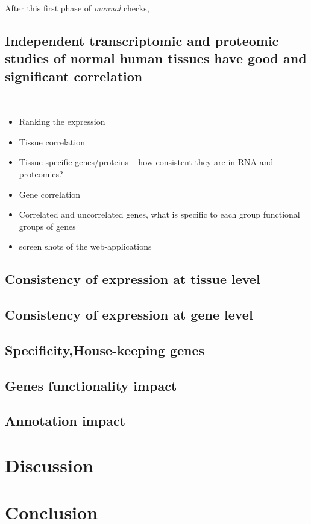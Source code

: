 After this first phase of \emph{manual} checks, 

\subsection{Independent transcriptomic and proteomic studies of normal
human tissues have good and significant correlation}
\label{sec:IntegrationGoodCorrProtTrans}



\clearpage\

\begin{itemize}
\item Ranking the expression
\item Tissue correlation
\item Tissue specific genes/proteins – how consistent they are in RNA and proteomics?
\item Gene correlation
\item Correlated and uncorrelated genes, what is specific to each group
    functional groups of genes
\item screen shots of the web-applications
\end{itemize}


\subsection{Consistency of expression at tissue level}
\subsection{Consistency of expression at gene level}
\subsection{Specificity,House-keeping genes}
\subsection{Genes functionality impact}
\subsection{Annotation impact}



\section{Discussion}
\section{Conclusion}






